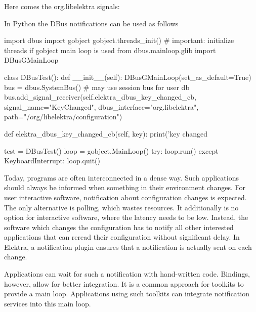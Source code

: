 Here comes the org.\+libelektra signals\+:




In Python the D\+Bus notifications can be used as follows


\begin{DoxyCode}
import dbus
import gobject
gobject.threads\_init()  # important: initialize threads if gobject main loop is used
from dbus.mainloop.glib import DBusGMainLoop

class DBusTest():
    def \_\_init\_\_(self):
        DBusGMainLoop(set\_as\_default=True)
        bus = dbus.SystemBus()  # may use session bus for user db
        bus.add\_signal\_receiver(self.elektra\_dbus\_key\_changed\_cb,
            signal\_name="KeyChanged",
            dbus\_interface="org.libelektra",
            path="/org/libelektra/configuration")

    def elektra\_dbus\_key\_changed\_cb(self, key):
        print('key changed %

test = DBusTest()
loop = gobject.MainLoop()
try:
    loop.run()
except KeyboardInterrupt:
    loop.quit()
\end{DoxyCode}


Today, programs are often interconnected in a dense way. Such applications should always be informed when something in their environment changes. For user interactive software, notification about configuration changes is expected. The only alternative is polling, which wastes resources. It additionally is no option for interactive software, where the latency needs to be low. Instead, the software which changes the configuration has to notify all other interested applications that can reread their configuration without significant delay. In Elektra, a notification plugin ensures that a notification is actually sent on each change.

Applications can wait for such a notification with hand-\/written code. Bindings, however, allow for better integration. It is a common approach for toolkits to provide a main loop. Applications using such toolkits can integrate notification services into this main loop.

